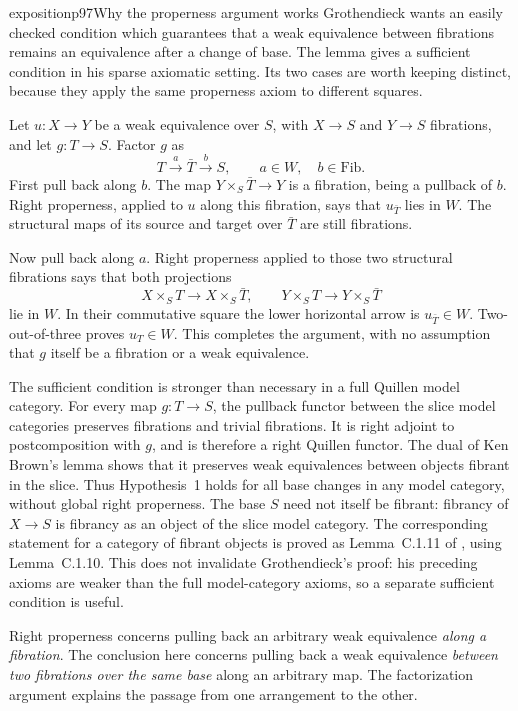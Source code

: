 \begin{dcomment}{exposition}{p97}{Why the properness argument works}
Grothendieck wants an easily checked condition which guarantees that a weak equivalence between fibrations remains an equivalence after a change of base. The lemma gives a sufficient condition in his sparse axiomatic setting. Its two cases are worth keeping distinct, because they apply the same properness axiom to different squares.

Let $u:X\to Y$ be a weak equivalence over $S$, with $X\to S$ and $Y\to S$ fibrations, and let $g:T\to S$. Factor $g$ as
\[
 T\xrightarrow{a}\bar T\xrightarrow{b}S,
 \qquad a\in W,\quad b\in\mathrm{Fib}.
\]
First pull back along $b$. The map $Y\times_S\bar T\to Y$ is a fibration, being a pullback of $b$. Right properness, applied to $u$ along this fibration, says that $u_{\bar T}$ lies in $W$. The structural maps of its source and target over $\bar T$ are still fibrations.

Now pull back along $a$. Right properness applied to those two structural fibrations says that both projections
\[
 X\times_S T\longrightarrow X\times_S\bar T,
 \qquad
 Y\times_S T\longrightarrow Y\times_S\bar T
\]
lie in $W$. In their commutative square the lower horizontal arrow is $u_{\bar T}\in W$. Two-out-of-three proves $u_T\in W$. This completes the argument, with no assumption that $g$ itself be a fibration or a weak equivalence.

The sufficient condition is stronger than necessary in a full Quillen model category. For every map $g:T\to S$, the pullback functor between the slice model categories preserves fibrations and trivial fibrations. It is right adjoint to postcomposition with $g$, and is therefore a right Quillen functor. The dual of Ken Brown's lemma shows that it preserves weak equivalences between objects fibrant in the slice. Thus Hypothesis~1 holds for all base changes in any model category, without global right properness. The base $S$ need not itself be fibrant: fibrancy of $X\to S$ is fibrancy as an object of the slice model category. The corresponding statement for a category of fibrant objects is proved as Lemma~C.1.11 of \citet{RiehlVerity2022Elements}, using Lemma~C.1.10. This does not invalidate Grothendieck's proof: his preceding axioms are weaker than the full model-category axioms, so a separate sufficient condition is useful.

Right properness concerns pulling back an arbitrary weak equivalence \emph{along a fibration}. The conclusion here concerns pulling back a weak equivalence \emph{between two fibrations over the same base} along an arbitrary map. The factorization argument explains the passage from one arrangement to the other.
\end{dcomment}

